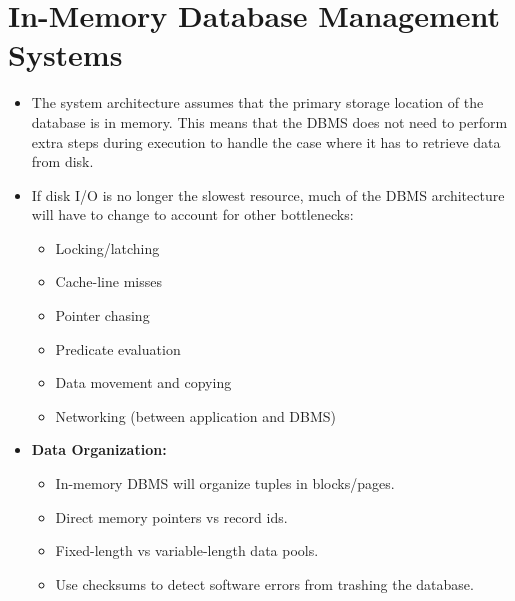 \documentclass[11pt]{article}
\begin{document}
\section{In-Memory Database Management Systems}
\begin{itemize}
    \item
    The system architecture assumes that the primary storage location of the database is in 
    memory. This means that the DBMS does not need to perform extra steps during execution to 
    handle the case where it has to retrieve data from disk.
    
    
    \item
    If disk I/O is no longer the slowest resource, much of the DBMS architecture will have to 
    change to account for other bottlenecks:~\cite{stonebraker2007}
    \begin{itemize}
        \item Locking/latching
        \item Cache-line misses
        \item Pointer chasing
        \item Predicate evaluation
        \item Data movement and copying
        \item Networking (between application and DBMS)
    \end{itemize}
    
    \item \textbf{Data Organization:}
    \begin{itemize}
        \item
        In-memory DBMS will organize tuples in blocks/pages.
        
        \item
        Direct memory pointers vs record ids.
        
        \item
        Fixed-length vs variable-length data pools.
        
        \item
        Use checksums to detect software errors from trashing the database.
        
%             
    \end{itemize}
    

\end{itemize}
\end{document}
